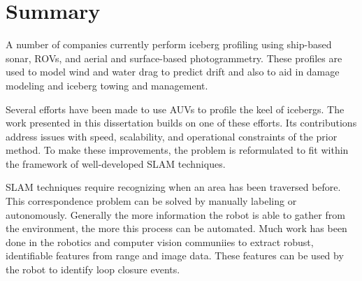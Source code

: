 
\section{Summary}

A number of companies currently perform iceberg profiling using ship-based sonar, ROVs, and aerial and surface-based photogrammetry. These profiles are used to model wind and water drag to predict drift and also to aid in damage modeling and iceberg towing and management. 

Several efforts have been made to use AUVs to profile the keel of icebergs. The work presented in this dissertation builds on one of these efforts. Its contributions address issues with speed, scalability, and operational constraints of the prior method. To make these improvements, the problem is reformulated to fit within the framework of well-developed SLAM techniques. 

SLAM techniques require recognizing when an area has been traversed before. This correspondence problem can be solved by manually labeling or autonomously. Generally the more information the robot is able to gather from the environment, the more this process can be automated. Much work has been done in the robotics and computer vision communiies to extract robust, identifiable features from range and image data. These features can be used by the robot to identify loop closure events.

